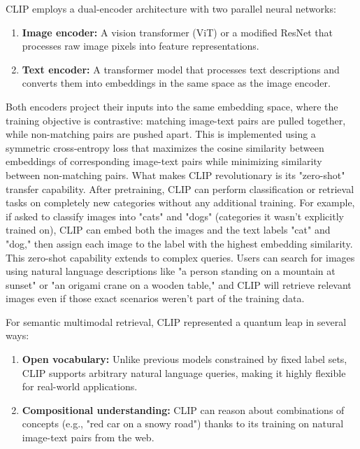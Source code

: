\documentclass[conference]{IEEEtran}
\begin{document}
\begin{enumerate}
CLIP employs a dual-encoder architecture with two parallel neural networks:

\begin{enumerate}
    \item \textbf{Image encoder:} A vision transformer (ViT) or a modified ResNet that processes raw image pixels into feature representations.
    
    \item \textbf{Text encoder:} A transformer model that processes text descriptions and converts them into embeddings in the same space as the image encoder.
\end{enumerate}

Both encoders project their inputs into the same embedding space, where the training objective is contrastive: matching image-text pairs are pulled together, while non-matching pairs are pushed apart. This is implemented using a symmetric cross-entropy loss that maximizes the cosine similarity between embeddings of corresponding image-text pairs while minimizing similarity between non-matching pairs.
What makes CLIP revolutionary is its "zero-shot" transfer capability. After pretraining, CLIP can perform classification or retrieval tasks on completely new categories without any additional training. For example, if asked to classify images into "cats" and "dogs" (categories it wasn't explicitly trained on), CLIP can embed both the images and the text labels "cat" and "dog," then assign each image to the label with the highest embedding similarity.
This zero-shot capability extends to complex queries. Users can search for images using natural language descriptions like "a person standing on a mountain at sunset" or "an origami crane on a wooden table," and CLIP will retrieve relevant images even if those exact scenarios weren't part of the training data.

For semantic multimodal retrieval, CLIP represented a quantum leap in several ways:

\begin{enumerate}
    \item \textbf{Open vocabulary:} Unlike previous models constrained by fixed label sets, CLIP supports arbitrary natural language queries, making it highly flexible for real-world applications.
    
    \item \textbf{Compositional understanding:} CLIP can reason about combinations of concepts (e.g., "red car on a snowy road") thanks to its training on natural image-text pairs from the web.
    

\end{enumerate}
\end{enumerate}
\end{document}
